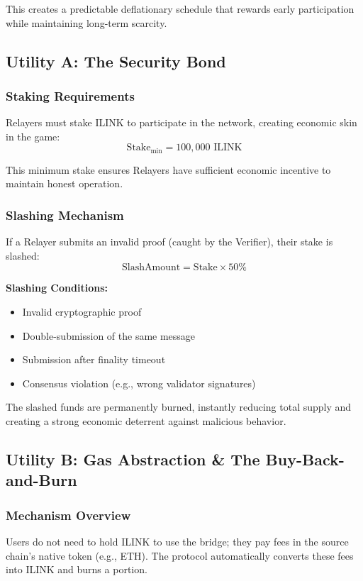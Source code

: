 \documentclass[11pt,a4paper]{article}
\begin{document}
This creates a predictable deflationary schedule that rewards early participation while maintaining long-term scarcity.

\subsection{Utility A: The Security Bond}

\subsubsection{Staking Requirements}
Relayers must stake ILINK to participate in the network, creating economic skin in the game:
$$ \text{Stake}_{\text{min}} = 100,000 \text{ ILINK} $$

This minimum stake ensures Relayers have sufficient economic incentive to maintain honest operation.

\subsubsection{Slashing Mechanism}
If a Relayer submits an invalid proof (caught by the Verifier), their stake is slashed:
$$ \text{SlashAmount} = \text{Stake} \times 50\% $$

\textbf{Slashing Conditions:}
\begin{itemize}
    \item Invalid cryptographic proof
    \item Double-submission of the same message
    \item Submission after finality timeout
    \item Consensus violation (e.g., wrong validator signatures)
\end{itemize}

The slashed funds are permanently burned, instantly reducing total supply and creating a strong economic deterrent against malicious behavior.

\subsection{Utility B: Gas Abstraction \& The Buy-Back-and-Burn}

\subsubsection{Mechanism Overview}
Users do not need to hold ILINK to use the bridge; they pay fees in the source chain's native token (e.g., ETH). The protocol automatically converts these fees into ILINK and burns a portion.
\end{document}
